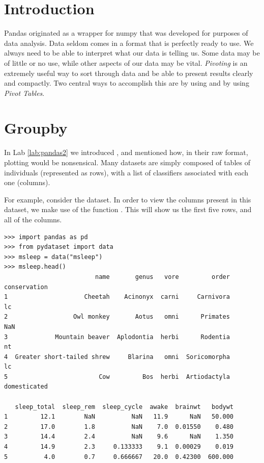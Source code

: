 \label{lab:pandas3}

\section*{Introduction}
Pandas originated as a wrapper for numpy that was developed for purposes of data analysis. Data seldom comes in a format that is perfectly ready to use.  We always need to be able to interpret what our data is telling us.  Some data may be of little or no use, while other aspects of our data may be vital.  \emph{Pivoting} is an extremely useful way to sort through data and be able to present results clearly and compactly.  Two central ways to accomplish this are by using  and by using \emph{Pivot Tables}.

\section*{Groupby}

In Lab \ref{lab:pandas2} we introduced , and mentioned how, in their raw format, plotting would be nonsensical.  Many datasets are simply composed of tables of individuals (represented as rows), with a list of classifiers associated with each one (columns).

For example, consider the  dataset.  In order to view the columns present in this dataset, we make use of the function .  This will show us the first five rows, and all of the columns.

\begin{lstlisting}
>>> import pandas as pd
>>> from pydataset import data
>>> msleep = data("msleep")
>>> msleep.head()
                         name       genus   vore         order  conservation  
1                     Cheetah    Acinonyx  carni     Carnivora            lc   
2                  Owl monkey       Aotus   omni      Primates           NaN   
3             Mountain beaver  Aplodontia  herbi      Rodentia            nt   
4  Greater short-tailed shrew     Blarina   omni  Soricomorpha            lc   
5                         Cow         Bos  herbi  Artiodactyla  domesticated   

   sleep_total  sleep_rem  sleep_cycle  awake  brainwt   bodywt  
1         12.1        NaN          NaN   11.9      NaN   50.000  
2         17.0        1.8          NaN    7.0  0.01550    0.480  
3         14.4        2.4          NaN    9.6      NaN    1.350  
4         14.9        2.3     0.133333    9.1  0.00029    0.019  
5          4.0        0.7     0.666667   20.0  0.42300  600.000 
\end{lstlisting}

